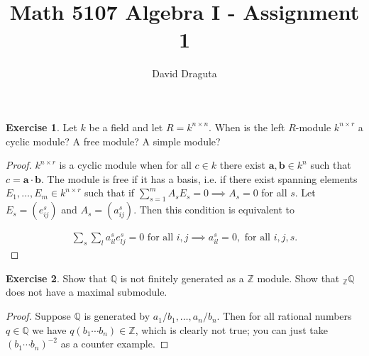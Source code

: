 \documentclass[12pt]{extarticle}
\title{ Math 5107 Algebra I - Assignment 1}
\author{David Draguta}
\newcommand{\Q}{\mathbb{Q}}
\newcommand{\Z}{\mathbb{Z}}
\newcommand{\<}{\langle}
\renewcommand{\>}{\rangle}
\theoremstyle{definition}
\newtheorem{exercise}{Exercise}
\begin{document}
\maketitle

\begin{exercise}
  Let $k$ be a field and let $R = k^{n \times n}$. When is the left $R$-module $k^{n \times r}$ a cyclic module? A free module? A simple module? 
\end{exercise}
\begin{proof}
  $k^{n \times r}$ is a cyclic module when for all $c \in k$ there exist $\mathbf{a}, \mathbf{b} \in k^n$ such that
  $c = \mathbf{a} \cdot \mathbf{b}$. The module is free if it has a basis, i.e. if there exist spanning elements $E_1, \dots, E_m \in k^{n \times r}$ such that if
  $\sum\limits_{s=1}^{m} A_s E_s = 0 \implies A_s = 0$ for all $s$. Let $E_s = (e_{ij}^s)$ and $A_s = (a_{ij}^s)$. Then this condition is equivalent to
  
  \begin{align*}
    \sum\limits_s \sum\limits_{l}a_{il}^s e_{lj}^s = 0 \text{ for all } i, j  \implies a_{il}^s = 0, \text { for all } i,j, s.
  \end{align*}

\end{proof}
\begin{exercise}
  Show that $\Q$ is not finitely generated as a $\Z$ module. Show that $_\Z\Q$ does not have a maximal submodule.
\end{exercise}

\begin{proof}
  Suppose $\Q$ is generated by $a_1/b_1, \dots, a_n/b_n$. Then for all rational numbers $q \in \Q$ we have $q(b_1 \cdots b_n) \in \Z$, which is clearly not true; you can just take $(b_1 \cdots b_n)^{-2}$ as a counter example.
\end{proof}
\end{document}
